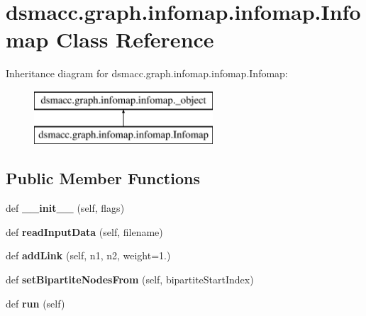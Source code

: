 \hypertarget{classdsmacc_1_1graph_1_1infomap_1_1infomap_1_1Infomap}{}\section{dsmacc.\+graph.\+infomap.\+infomap.\+Infomap Class Reference}
\label{classdsmacc_1_1graph_1_1infomap_1_1infomap_1_1Infomap}
Inheritance diagram for dsmacc.\+graph.\+infomap.\+infomap.\+Infomap\+:\begin{figure}[H]
\begin{center}
\leavevmode
\includegraphics[height=2.000000cm]{classdsmacc_1_1graph_1_1infomap_1_1infomap_1_1Infomap}
\end{center}
\end{figure}
\subsection*{Public Member Functions}
\begin{DoxyCompactItemize}
\item 
\mbox{\label{classdsmacc_1_1graph_1_1infomap_1_1infomap_1_1Infomap_a2d7679ce89a7269810d99780c89a8142}} 
def {\bfseries \+\_\+\+\_\+init\+\_\+\+\_\+} (self, flags)
\item 
\mbox{\label{classdsmacc_1_1graph_1_1infomap_1_1infomap_1_1Infomap_a20dd9d0635ecb093b9576dd103f1b1f9}} 
def {\bfseries read\+Input\+Data} (self, filename)
\item 
\mbox{\label{classdsmacc_1_1graph_1_1infomap_1_1infomap_1_1Infomap_afb5e190953406c0c36f8e6adb821465b}} 
def {\bfseries add\+Link} (self, n1, n2, weight=1.)
\item 
\mbox{\label{classdsmacc_1_1graph_1_1infomap_1_1infomap_1_1Infomap_a74f157e7f5ed950df8f0032671ccac0d}} 
def {\bfseries set\+Bipartite\+Nodes\+From} (self, bipartite\+Start\+Index)
\item 
\mbox{\label{classdsmacc_1_1graph_1_1infomap_1_1infomap_1_1Infomap_a3270623f0256c917c322e62692f9b31b}} 
def {\bfseries run} (self)
\end{DoxyCompactItemize}
